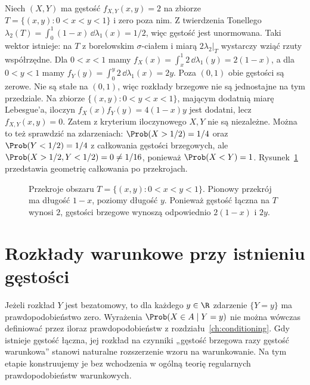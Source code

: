 \begin{przyklad}
Niech $(X,Y)$ ma gęstość $f_{X,Y}(x,y)=2$ na zbiorze
$T=\{(x,y):0<x<y<1\}$ i zero poza nim.
Z twierdzenia Tonellego
$\lambda_2(T)=\int_0^1(1-x)\,\dd\lambda_1(x)=1/2$,
więc gęstość jest unormowana. Taki wektor istnieje:
na $T$ z borelowskim $\sigma$-ciałem i miarą
$2\lambda_2|_T$ wystarczy wziąć rzuty współrzędne.
Dla $0<x<1$ mamy $f_X(x)=\int_x^1 2\,\dd\lambda_1(y)=2(1-x)$,
a dla $0<y<1$ mamy $f_Y(y)=\int_0^y 2\,\dd\lambda_1(x)=2y$.
Poza $(0,1)$ obie gęstości są zerowe. Nie są stałe na
$(0,1)$, więc rozkłady brzegowe nie są jednostajne na tym przedziale.
Na zbiorze $\{(x,y):0<y<x<1\}$, mającym dodatnią
miarę Lebesgue'a, iloczyn $f_X(x)f_Y(y)=4(1-x)y$ jest
dodatni, lecz $f_{X,Y}(x,y)=0$. Zatem z kryterium iloczynowego
$X,Y$ nie są niezależne. Można to też sprawdzić na zdarzeniach:
$\Prob(X>1/2)=1/4$ oraz $\Prob(Y<1/2)=1/4$
z całkowania gęstości brzegowych, ale
$\Prob(X>1/2,Y<1/2)=0\neq1/16$, ponieważ $\Prob(X<Y)=1$.
Rysunek~\ref{fig:rp1-04-triangle-marginals} przedstawia geometrię całkowania po przekrojach.
\end{przyklad}

\begin{figure}[htbp]
\centering
{}
\caption{Przekroje obszaru $T=\{(x,y):0<x<y<1\}$.
Pionowy przekrój ma długość $1-x$, poziomy długość $y$.
Ponieważ gęstość łączna na $T$ wynosi $2$,
gęstości brzegowe wynoszą odpowiednio $2(1-x)$ i $2y$.}
\label{fig:rp1-04-triangle-marginals}
\end{figure}


\section{Rozkłady warunkowe przy istnieniu gęstości}
Jeżeli rozkład $Y$ jest bezatomowy, to dla każdego $y\in\R$
zdarzenie $\{Y=y\}$ ma prawdopodobieństwo zero.
Wyrażenia $\Prob(X\in A\mid Y=y)$ nie można wówczas
definiować przez iloraz prawdopodobieństw z rozdziału~\ref{ch:conditioning}.
Gdy istnieje gęstość łączna, jej rozkład na czynniki
„gęstość brzegowa razy gęstość warunkowa” stanowi
naturalne rozszerzenie wzoru na warunkowanie. Na tym etapie
konstruujemy je bez wchodzenia w ogólną teorię regularnych
prawdopodobieństw warunkowych.


